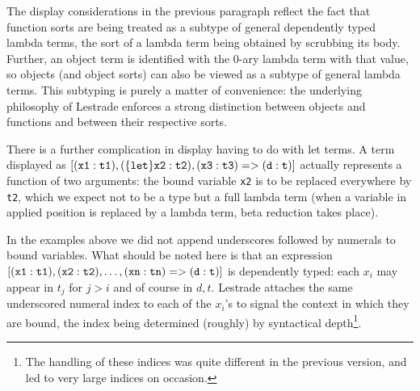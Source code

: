 \documentclass[12pt]{article}
\begin{document}
The display considerations in the previous paragraph reflect the fact that function sorts are being treated as a subtype of general dependently typed lambda terms, the sort of a lambda term being obtained by scrubbing its body.  Further, an object term is identified with the 0-ary lambda term with that value, so objects (and object sorts) can also be viewed as a subtype of general lambda terms.  This subtyping is purely a matter of convenience:  the underlying philosophy of Lestrade enforces a strong distinction between objects and functions and between their respective sorts.

There is a further complication in display having to do with let terms.  A term
displayed as ${\mathbb {\tt [(x1:t1),(\{let\} x2:t2),(x3:t3) => (d:t)]}}$ actually represents a function of two arguments:  the bound variable {\tt x2} is to be replaced everywhere
by {\tt t2}, which we expect not to be a type but a full lambda term (when a variable in applied position is replaced by a lambda term, beta reduction takes place).

In the examples above we did not append underscores followed by numerals to bound variables.  What should be noted here is that an expression
${\mathbb {\tt [(x1:t1),(x2:t2),\ldots,(xn:tn)=>(d:t)]}}$ is dependently typed:  each $x_i$ may appear in $t_j$ for $j>i$ and of course in $d,t$.  Lestrade attaches the same underscored numeral index to each of the $x_i$'s to signal the context in which they are bound, the index being determined (roughly) by syntactical depth\footnote{The handling of these indices was quite different in the previous version, and led to very large indices on occasion.}.

\newpage
\end{document}
